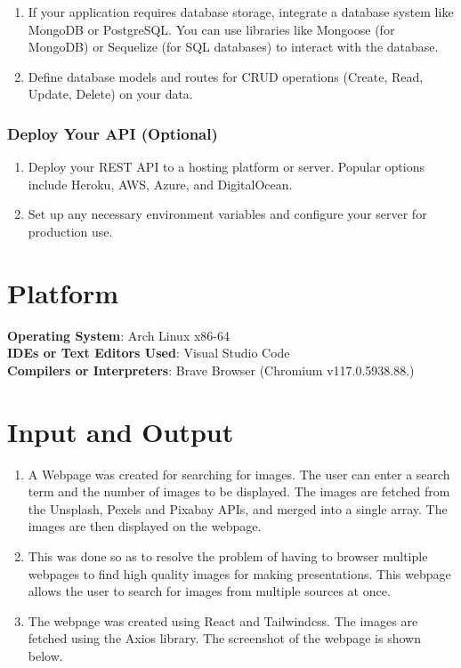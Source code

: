 \documentclass[11pt]{article}
\begin{document}
\begin{enumerate}
    \item If your application requires database storage, integrate a database system like MongoDB or PostgreSQL. You can use libraries like Mongoose (for MongoDB) or Sequelize (for SQL databases) to interact with the database.
    \item Define database models and routes for CRUD operations (Create, Read, Update, Delete) on your data.
\end{enumerate}

\subsubsection{Deploy Your API (Optional)}

\begin{enumerate}
    \item Deploy your REST API to a hosting platform or server. Popular options include Heroku, AWS, Azure, and DigitalOcean.
    \item Set up any necessary environment variables and configure your server for production use.
\end{enumerate}

\section{Platform}
\textbf{Operating System}: Arch Linux x86-64 \\
\textbf{IDEs or Text Editors Used}: Visual Studio Code\\
\textbf{Compilers or Interpreters}: Brave Browser (Chromium v117.0.5938.88.) \\

\section{Input and Output}

\begin{enumerate}
    \item A Webpage was created for searching for images. The user can enter a search term and the number of images to be displayed. The images are fetched from the Unsplash, Pexels and Pixabay APIs, and merged into a single array. The images are then displayed on the webpage.
    \item This was done so as to resolve the problem of having to browser multiple webpages to find high quality images for making presentations. This webpage allows the user to search for images from multiple sources at once.
    \item The webpage was created using React and Tailwindcss. The images are fetched using the Axios library. The screenshot of the webpage is shown below.
\end{enumerate}
\end{document}
